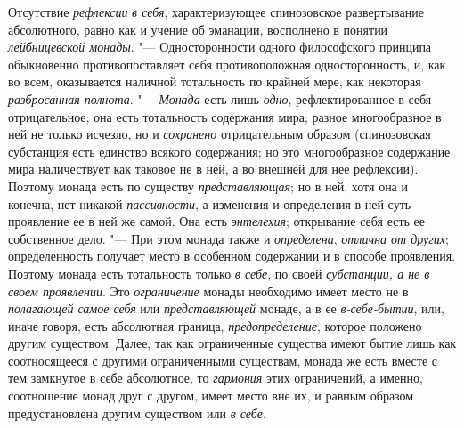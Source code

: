 Отсутствие {\em рефлексии} {\em в
себя}, характеризующее спинозовское развертывание абсолютного, равно как и
учение об эманации, восполнено в понятии
{\em лейбницевской монады}. "--- Односторонности одного
философского принципа обыкновенно противопоставляет себя противоположная
односторонность, и, как во всем, оказывается наличной тотальность по
крайней мере, как некоторая {\em разбросанная
полнота}. "--- {\em Монада} есть лишь
{\em одно}, рефлектированное в себя отрицательное; она
есть тотальность содержания мира; разное многообразное в ней не только
исчезло, но и {\em сохранено} отрицательным образом
(спинозовская субстанция есть единство всякого содержания; но это
многообразное содержание мира наличествует как таковое не в ней, а во
внешней для нее рефлексии). Поэтому монада есть по существу
{\em представляющая}; но в ней, хотя она и конечна, нет
никакой {\em пассивности}, а изменения и определения в
ней суть проявление ее в ней же самой. Она есть
{\em энтелехия}; открывание себя есть ее собственное
дело. "--- При этом монада также и {\em определена},
{\em отлична от других}; определенность получает место
в особенном содержании и в способе проявления. Поэтому монада есть
тотальность только {\em в себе}, по своей
{\em субстанции, а не в своем проявлении}. Это
{\em ограничение} монады необходимо имеет место не в
{\em полагающей самое себя} или
{\em представляющей} монаде, а в ее
{\em в-себе-бытии}, или, иначе говоря, есть абсолютная
граница, {\em предопределение}, которое положено
другим существом. Далее, так как ограниченные существа имеют бытие лишь как
соотносящееся с другими ограниченными существам, монада же есть вместе с
тем замкнутое в себе абсолютное, то {\em гармония} этих
ограничений, а именно, соотношение монад друг с другом, имеет место вне их,
и равным образом предустановлена другим существом или
{\em в себе}.

